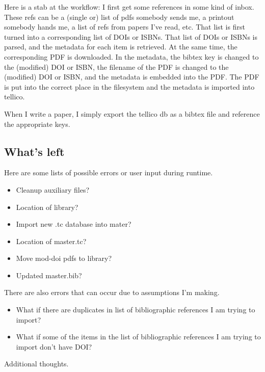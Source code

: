 \documentclass[letterpaper,12pt]{article}
\begin{document}
Here is a stab at the workflow: I first get some references in some kind of inbox. These refs can be a (single or) list of pdfs somebody sends me, a printout somebody hands me, a list of refs from papers I've read, etc. That list is first turned into a corresponding list of DOIs or ISBNs. That list of DOIs or ISBNs is parsed, and the metadata for each item is retrieved. At the same time, the corresponding PDF is downloaded. In the metadata, the bibtex key is changed to the (modified) DOI or ISBN, the filename of the PDF is changed to the (modified) DOI or ISBN, and the metadata is embedded into the PDF. The PDF is put into the correct place in the filesystem and the metadata is imported into tellico.

When I write a paper, I simply export the tellico db as a bibtex file and reference the appropriate keys.

\subsection{What's left}
Here are some lists of possible errors or user input during runtime.

\begin{itemize}
\item Cleanup auxiliary files?
\item Location of library?
\item Import new .tc database into mater?
\item Location of master.tc?
\item Move mod-doi pdfs to library?
\item Updated master.bib?
\end{itemize}

There are also errors that can occur due to assumptions I'm making.

\begin{itemize}
\item What if there are duplicates in list of bibliographic references I am trying to import?
\item What if some of the items in the list of bibliographic references I am trying to import don't have DOI?
\end{itemize}

Additional thoughts.
\end{document}
